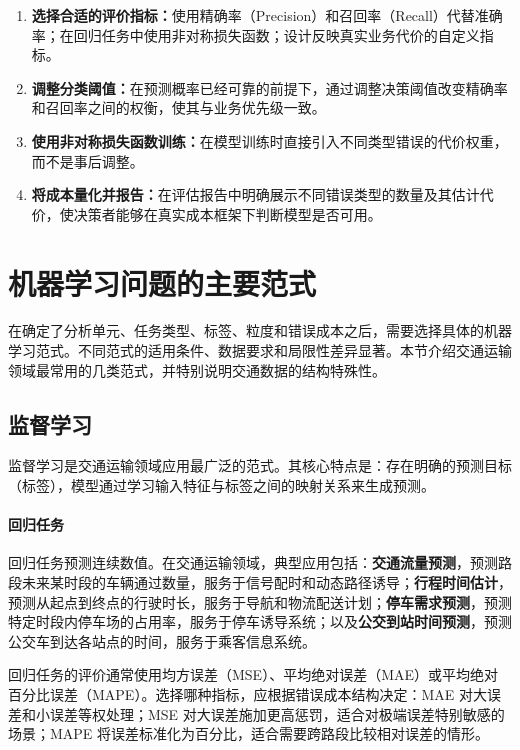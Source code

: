 \begin{enumerate}
  \item \textbf{选择合适的评价指标：}使用精确率（Precision）和召回率（Recall）代替准确率；在回归任务中使用非对称损失函数；设计反映真实业务代价的自定义指标。
  \item \textbf{调整分类阈值：}在预测概率已经可靠的前提下，通过调整决策阈值改变精确率和召回率之间的权衡，使其与业务优先级一致。
  \item \textbf{使用非对称损失函数训练：}在模型训练时直接引入不同类型错误的代价权重，而不是事后调整。
  \item \textbf{将成本量化并报告：}在评估报告中明确展示不同错误类型的数量及其估计代价，使决策者能够在真实成本框架下判断模型是否可用。
\end{enumerate}

\section{机器学习问题的主要范式}

在确定了分析单元、任务类型、标签、粒度和错误成本之后，需要选择具体的机器学习范式。不同范式的适用条件、数据要求和局限性差异显著。本节介绍交通运输领域最常用的几类范式，并特别说明交通数据的结构特殊性。

\subsection{监督学习}

监督学习是交通运输领域应用最广泛的范式。其核心特点是：存在明确的预测目标（标签），模型通过学习输入特征与标签之间的映射关系来生成预测。

\paragraph{回归任务}

回归任务预测连续数值。在交通运输领域，典型应用包括：\textbf{交通流量预测}，预测路段未来某时段的车辆通过数量，服务于信号配时和动态路径诱导；\textbf{行程时间估计}，预测从起点到终点的行驶时长，服务于导航和物流配送计划；\textbf{停车需求预测}，预测特定时段内停车场的占用率，服务于停车诱导系统；以及\textbf{公交到站时间预测}，预测公交车到达各站点的时间，服务于乘客信息系统。

回归任务的评价通常使用均方误差（MSE）、平均绝对误差（MAE）或平均绝对百分比误差（MAPE）。选择哪种指标，应根据错误成本结构决定：MAE 对大误差和小误差等权处理；MSE 对大误差施加更高惩罚，适合对极端误差特别敏感的场景；MAPE 将误差标准化为百分比，适合需要跨路段比较相对误差的情形。

